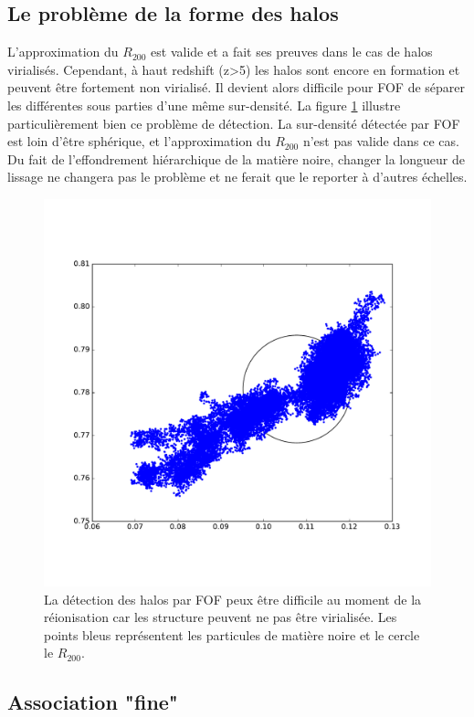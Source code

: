 \subsection{Le problème de la forme des halos}


L'approximation du $R_{200}$ est valide et a fait ses preuves dans le cas de halos virialisés.  %
Cependant, à haut redshift (z>5) les halos sont encore en formation et peuvent être fortement non virialisé.
Il devient alors difficile pour \ac{FOF} de séparer les différentes sous parties d'une même sur-densité.
La figure \ref{fig:part_halo} illustre particulièrement bien ce problème de détection.
La sur-densité détectée par \ac{FOF} est loin d'être sphérique, et l'approximation du $R_{200}$ n'est pas valide dans ce cas.
Du fait de l'effondrement hiérarchique de la matière noire, changer la longueur de lissage ne changera pas le problème et ne ferait que le reporter à d'autres échelles.

\begin{figure}
	\centering
	\includegraphics[width=.75\textwidth]{img/03/part_halo_R200.pdf} 
    \caption{La détection des halos par \ac{FOF} peux être difficile au moment de la réionisation car les structure peuvent ne pas être virialisée.
    Les points bleus représentent les particules de matière noire et le cercle le $R_{200}$.
 	\label{fig:part_halo}}
\end{figure}


\subsection{Association "fine"}

